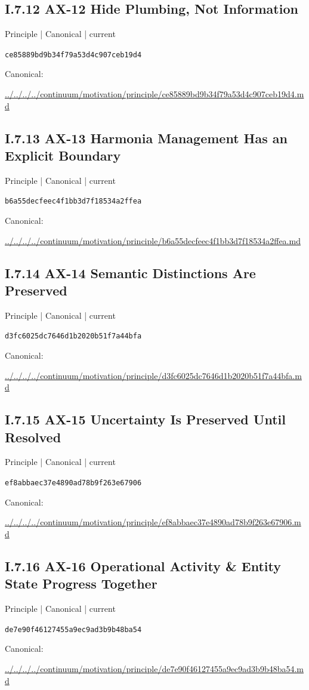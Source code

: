 \documentclass[10pt,a4paper]{article}
\begin{document}
\subsection*{I.7.12 AX-12 Hide Plumbing, Not Information}
{\small Principle | Canonical | current}\par
\texttt{ce85889bd9b34f79a53d4c907ceb19d4}\par
Canonical: \par
{\footnotesize\url{../../../../continuum/motivation/principle/ce85889bd9b34f79a53d4c907ceb19d4.md}}\par
\subsection*{I.7.13 AX-13 Harmonia Management Has an Explicit Boundary}
{\small Principle | Canonical | current}\par
\texttt{b6a55decfeec4f1bb3d7f18534a2ffea}\par
Canonical: \par
{\footnotesize\url{../../../../continuum/motivation/principle/b6a55decfeec4f1bb3d7f18534a2ffea.md}}\par
\subsection*{I.7.14 AX-14 Semantic Distinctions Are Preserved}
{\small Principle | Canonical | current}\par
\texttt{d3fc6025dc7646d1b2020b51f7a44bfa}\par
Canonical: \par
{\footnotesize\url{../../../../continuum/motivation/principle/d3fc6025dc7646d1b2020b51f7a44bfa.md}}\par
\subsection*{I.7.15 AX-15 Uncertainty Is Preserved Until Resolved}
{\small Principle | Canonical | current}\par
\texttt{ef8abbaec37e4890ad78b9f263e67906}\par
Canonical: \par
{\footnotesize\url{../../../../continuum/motivation/principle/ef8abbaec37e4890ad78b9f263e67906.md}}\par
\subsection*{I.7.16 AX-16 Operational Activity \& Entity State Progress Together}
{\small Principle | Canonical | current}\par
\texttt{de7e90f46127455a9ec9ad3b9b48ba54}\par
Canonical: \par
{\footnotesize\url{../../../../continuum/motivation/principle/de7e90f46127455a9ec9ad3b9b48ba54.md}}\par
\end{document}
